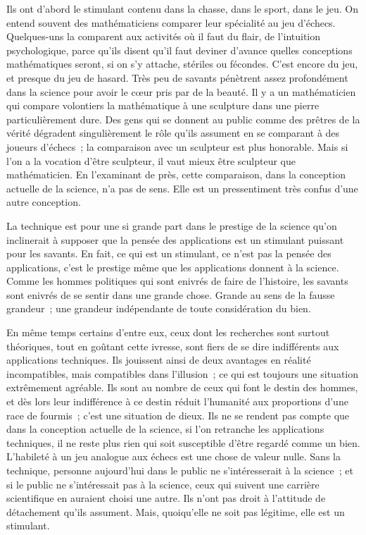 \documentclass[french,twoside]{book} %
\begin{document}
Ils ont d'abord le stimulant contenu dans la chasse, dans le sport, dans le jeu. On entend souvent des mathématiciens comparer leur spécialité au jeu d'échecs. Quelques-uns la comparent aux activités où il faut du flair, de l'intuition psychologique, parce qu'ils disent qu'il faut deviner d'avance quelles conceptions mathématiques seront, si on s'y attache, stériles ou fécondes. C'est encore du jeu, et presque du jeu de hasard. Très peu de savants pénètrent assez profondément dans la science pour avoir le cœur pris par de la beauté. Il y a un mathématicien qui compare volontiers la mathématique à une sculpture dans une pierre particulièrement dure. Des gens qui se donnent au public comme des prêtres de la vérité dégradent singulièrement le rôle qu'ils assument en se comparant à des joueurs d'échecs ; la comparaison avec un sculpteur est plus honorable. Mais si l'on a la vocation d'être sculpteur, il vaut mieux être sculpteur que mathématicien. En l'examinant de près, cette comparaison, dans la conception actuelle de la science, n'a pas de sens. Elle est un pressentiment très confus d'une autre conception.\par
La technique est pour une si grande part dans le prestige de la science qu'on inclinerait à supposer que la pensée des applications est un stimulant puissant pour les savants. En fait, ce qui est un stimulant, ce n'est pas la pensée des applications, c'est le prestige même que les applications donnent à la science. Comme les hommes politiques qui sont enivrés de faire de l'histoire, les savants sont enivrés de se sentir dans une grande chose. Grande au sens de la fausse grandeur ; une grandeur indépendante de toute considération du bien.\par
En même temps certains d'entre eux, ceux dont les recherches sont surtout théoriques, tout en goûtant cette ivresse, sont fiers de se dire indifférents aux applications techniques. Ils jouissent ainsi de deux avantages en réalité incompatibles, mais compatibles dans l'illusion ; ce qui est toujours une situation extrêmement agréable. Ils sont au nombre de ceux qui font le destin des hommes, et dès lors leur indifférence à ce destin réduit l'humanité aux proportions d'une race de fourmis ; c'est une situation de dieux. Ils ne se rendent pas compte que dans la conception actuelle de la science, si l'on retranche les applications techniques, il ne reste plus rien qui soit susceptible d'être regardé comme un bien. L'habileté à un jeu analogue aux échecs est une chose de valeur nulle. Sans la technique, personne aujourd'hui dans le public ne s'intéresserait à la science ; et si le public ne s'intéressait pas à la science, ceux qui suivent une carrière scientifique en auraient choisi une autre. Ils n'ont pas droit à l'attitude de détachement qu'ils assument. Mais, quoiqu'elle ne soit pas légitime, elle est un stimulant.\par
\end{document}
